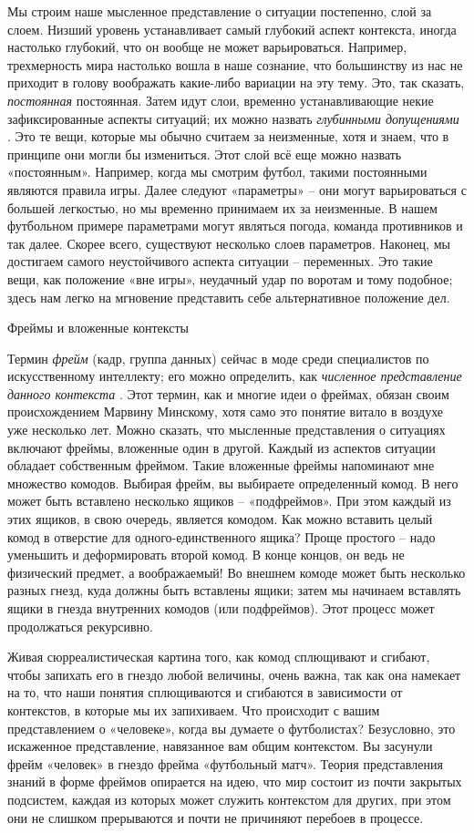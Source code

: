 \documentclass[../main.tex]{subfiles}
\begin{document}
Мы строим наше мысленное представление о ситуации постепенно, слой за слоем. Низший уровень устанавливает самый глубокий аспект контекста, иногда настолько глубокий, что он вообще не может варьироваться. Например, трехмерность мира настолько вошла в наше сознание, что большинству из нас не приходит в голову воображать какие-либо вариации на эту тему. Это, так сказать, \emph{постоянная} постоянная. Затем идут слои, временно устанавливающие некие зафиксированные аспекты ситуаций; их можно назвать \emph{глубинными допущениями} . Это те вещи, которые мы обычно считаем за неизменные, хотя и знаем, что в принципе они могли бы измениться. Этот слой всё еще можно назвать «постоянным». Например, когда мы смотрим футбол, такими постоянными являются правила игры. Далее следуют «параметры» \--- они могут варьироваться с большей легкостью, но мы временно принимаем их за неизменные. В нашем футбольном примере параметрами могут являться погода, команда противников и так далее. Скорее всего, существуют несколько слоев параметров. Наконец, мы достигаем самого неустойчивого аспекта ситуации \--- переменных. Это такие вещи, как положение «вне игры», неудачный удар по воротам и тому подобное; здесь нам легко на мгновение представить себе альтернативное положение дел.

Фреймы и вложенные контексты

Термин \emph{фрейм} (кадр, группа данных) сейчас в моде среди специалистов по искусственному интеллекту; его можно определить, как \emph{численное представление данного контекста} . Этот термин, как и многие идеи о фреймах, обязан своим происхождением Марвину Минскому, хотя само это понятие витало в воздухе уже несколько лет. Можно сказать, что мысленные представления о ситуациях включают фреймы, вложенные один в другой. Каждый из аспектов ситуации обладает собственным фреймом. Такие вложенные фреймы напоминают мне множество комодов. Выбирая фрейм, вы выбираете определенный комод. В него может быть вставлено несколько ящиков \--- «подфреймов». При этом каждый из этих ящиков, в свою очередь, является комодом. Как можно вставить целый комод в отверстие для одного-единственного ящика? Проще простого \--- надо уменьшить и деформировать второй комод. В конце концов, он ведь не физический предмет, а воображаемый! Во внешнем комоде может быть несколько разных гнезд, куда должны быть вставлены ящики; затем мы начинаем вставлять ящики в гнезда внутренних комодов (или подфреймов). Этот процесс может продолжаться рекурсивно.

Живая сюрреалистическая картина того, как комод сплющивают и сгибают, чтобы запихать его в гнездо любой величины, очень важна, так как она намекает на то, что наши понятия сплющиваются и сгибаются в зависимости от контекстов, в которые мы их запихиваем. Что происходит с вашим представлением о «человеке», когда вы думаете о футболистах? Безусловно, это искаженное представление, навязанное вам общим контекстом. Вы засунули фрейм «человек» в гнездо фрейма «футбольный матч». Теория представления знаний в форме фреймов опирается на идею, что мир состоит из почти закрытых подсистем, каждая из которых может служить контекстом для других, при этом они не слишком прерываются и почти не причиняют перебоев в процессе.
\end{document}

